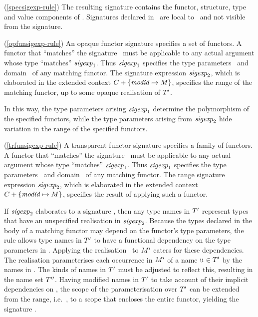 \comments
\begin{description}

\item{(\ref{specsigexp-rule})} The
    resulting signature contains the functor, structure, type and value
    components of \E. Signatures declared in
    \spec\ are local to \spec\ and not visible from the signature.

\item{(\ref{opfunsigexp-rule})}
     An opaque functor signature specifies a set of functors.
     A functor that ``matches'' the signature \opfunsigexp\
     must be applicable to any actual argument whose type ``matches''
     ${\it sigexp}_1$.
     Thus ${\it sigexp}_1$ specifies
     the type parameters \T\ and domain \M\ of  any matching functor.
     The signature expression ${\it sigexp}_2$,
     which is elaborated in the extended context $C+\{{\it modid}\mapsto M\}$, 
     specifies the range of the matching functor, up to
     some opaque realisation of $T'$.


     In this way, the type parameters arising ${\it sigexp}_1$
     determine the polymorphism of the specified
     functors, while  
     the type parameters
     arising from ${\it sigexp}_2$ hide variation in
     the range of the  specified functors. 
     

\item{(\ref{trfunsigexp-rule})}
     A transparent functor signature specifies a family of functors.
     A functor that ``matches'' the signature \trfunsigexp\
     must be applicable to any actual argument whose type ``matches''
     ${\it sigexp}_1$.
     Thus ${\it sigexp}_1$ specifies
     the type parameters \T\ and domain \M\ of  any matching functor.
     The range signature expression ${\it sigexp}_2$,
     which is elaborated in the extended context $C+\{{\it modid}\mapsto M\}$, 
     specifies the result of applying such a functor.
     
     If ${\it sigexp}_2$ elaborates to
     a signature
     , then 
     any type names in $T'$ represent types that have an
     unspecified realisation in ${\it sigexp}_2$.
     Because the types declared in the body of a matching functor may depend
     on the functor's type parameters, 
     the rule allows type names in $T'$
     to have a functional dependency  on the type parameters in \T.
     Applying the realisation
     \tyrea\ to $M'$ caters for these
     dependencies. The realisation
     parameterises each occurrence in
     $M'$ of a name ${\rm u}^{{}}\in T'$ by the names in \T.
     The kinds of names in $T'$ must be 
     adjusted to reflect this, resulting in the name set $T''$.
     Having modified names in $T'$ to take account of  their
     implicit dependencies on \T, the scope of the
     parameterisation over $T'$ can be extended from the
     range, i.e.\ \sig{\T'}{\M'}, to a scope 
     that encloses the entire functor,
     yielding the signature
     .


\end{description}
